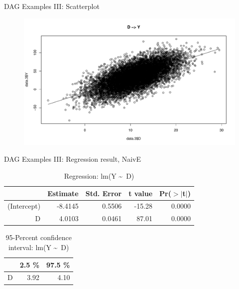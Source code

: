 \documentclass{beamer}\usepackage[]{graphicx}\usepackage[]{color}
\makeatletter
\def\maxwidth{ %
  \ifdim\Gin@nat@width>\linewidth
    \linewidth
  \else
    \Gin@nat@width
  \fi
}
\newenvironment{knitrout}{}{} %
\makeatother
\begin{document}
\begin{frame}{DAG Examples III: Scatterplot}
\begin{figure}
\begin{knitrout}
\color{fgcolor}
\includegraphics[width=\maxwidth]{figure/ExamplesIIIScatterplot-1} 

\end{knitrout}
\end{figure}
\end{frame}


\begin{frame}[fragile]{DAG Examples III: Regression result, NaivE}
\begin{table}[ht]
\centering
\begingroup\small
\begin{tabular}{rrrrr}
  \hline
 & Estimate & Std. Error & t value & Pr($>$$|$t$|$) \\ 
  \hline
(Intercept) & -8.4145 & 0.5506 & -15.28 & 0.0000 \\ 
  D & 4.0103 & 0.0461 & 87.01 & 0.0000 \\ 
   \hline
\end{tabular}
\endgroup
\caption{Regression: lm(Y \textasciitilde ~D)} 
\end{table}
\begin{table}[ht]
\centering
\begingroup\small
\begin{tabular}{rrr}
  \hline
 & 2.5 \% & 97.5 \% \\ 
  \hline
D & 3.92 & 4.10 \\ 
   \hline
\end{tabular}
\endgroup
\caption{95-Percent confidence interval: lm(Y \textasciitilde ~D)} 
\end{table}

\end{frame}
\end{document}
